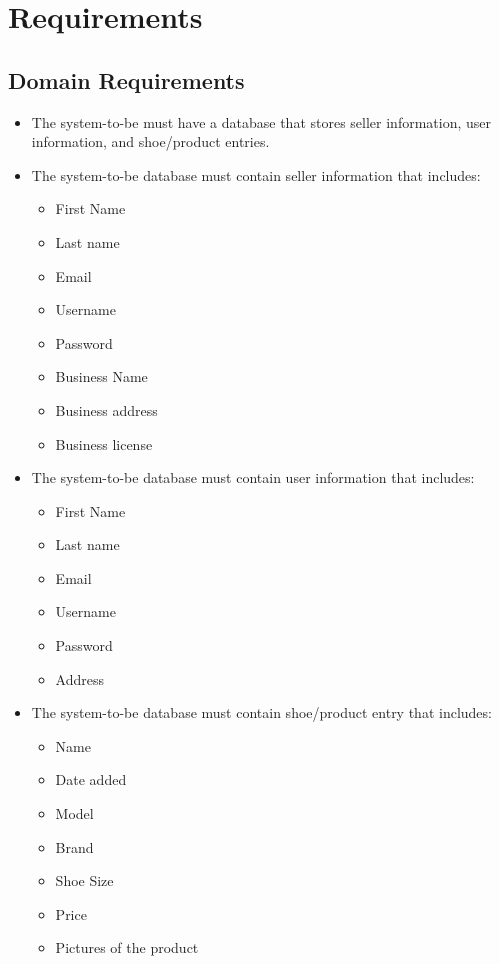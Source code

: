 \section{Requirements}
\subsection{Domain Requirements}
\begin{itemize}
  \item The system-to-be must have a database that stores seller information, user information, and shoe/product entries.
  \item The system-to-be database must contain seller information that includes:
        \begin{itemize}
          \item First Name
          \item Last name
          \item Email
          \item Username
          \item Password
          \item Business Name
          \item Business address
          \item Business license
        \end{itemize}
  \item The system-to-be database must contain user information that includes:
        \begin{itemize}
          \item First Name
          \item Last name
          \item Email
          \item Username
          \item Password
          \item Address
        \end{itemize}
  \item The system-to-be database must contain shoe/product entry that includes:
        \begin{itemize}
          \item Name
          \item Date added
          \item Model
          \item Brand
          \item Shoe Size
          \item Price
          \item Pictures of the product

\end{itemize}
\end{itemize}
